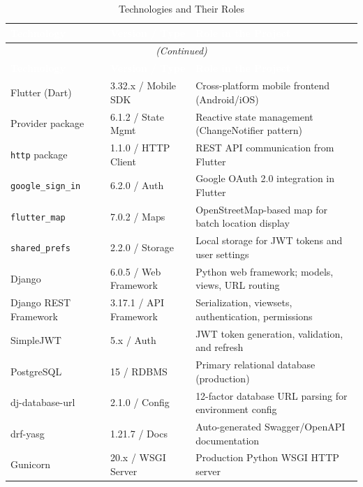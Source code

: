 \documentclass[12pt, a4paper]{report}
\begin{document}
\begin{longtable}{p{3cm} p{3.5cm} p{6cm}}
\caption{Technologies and Their Roles}\label{tab:tech}\\
\toprule
\rowcolor{tablehead}
\textcolor{white}{\textbf{Technology}} &
\textcolor{white}{\textbf{Version / Type}} &
\textcolor{white}{\textbf{Role in the Project}}\\
\midrule
\endfirsthead
\multicolumn{3}{c}{\small\itshape (Continued)}\\
\toprule
\rowcolor{tablehead}
\textcolor{white}{\textbf{Technology}} &
\textcolor{white}{\textbf{Version / Type}} &
\textcolor{white}{\textbf{Role in the Project}}\\
\midrule
\endhead
\bottomrule
\endfoot
Flutter (Dart)         & 3.32.x / Mobile SDK    & Cross-platform mobile frontend (Android/iOS)\\
\rowcolor{batchitLight}
Provider package       & 6.1.2 / State Mgmt     & Reactive state management (ChangeNotifier pattern)\\
\texttt{http} package  & 1.1.0 / HTTP Client    & REST API communication from Flutter\\
\rowcolor{batchitLight}
\texttt{google\_sign\_in} & 6.2.0 / Auth        & Google OAuth 2.0 integration in Flutter\\
\texttt{flutter\_map}  & 7.0.2 / Maps           & OpenStreetMap-based map for batch location display\\
\rowcolor{batchitLight}
\texttt{shared\_prefs} & 2.2.0 / Storage        & Local storage for JWT tokens and user settings\\
Django                 & 6.0.5 / Web Framework  & Python web framework; models, views, URL routing\\
\rowcolor{batchitLight}
Django REST Framework  & 3.17.1 / API Framework & Serialization, viewsets, authentication, permissions\\
SimpleJWT              & 5.x / Auth             & JWT token generation, validation, and refresh\\
\rowcolor{batchitLight}
PostgreSQL             & 15 / RDBMS             & Primary relational database (production)\\
dj-database-url        & 2.1.0 / Config         & 12-factor database URL parsing for environment config\\
\rowcolor{batchitLight}
drf-yasg               & 1.21.7 / Docs          & Auto-generated Swagger/OpenAPI documentation\\
Gunicorn               & 20.x / WSGI Server     & Production Python WSGI HTTP server\\

\end{longtable}
\end{document}
